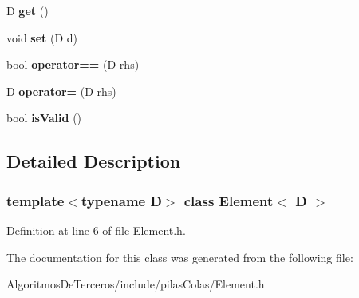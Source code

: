 \begin{DoxyCompactItemize}
D {\bfseries get} ()
\item 
\mbox{\label{class_element_a5327720f91a6006429b6b3a2eec46aaa}} 
void {\bfseries set} (D d)
\item 
\mbox{\label{class_element_a26ca0bf7130ed93df363576b9666ceeb}} 
bool {\bfseries operator==} (D rhs)
\item 
\mbox{\label{class_element_a18998203e5826498188b22b859927839}} 
D {\bfseries operator=} (D rhs)
\item 
\mbox{\label{class_element_a6f2ef9738bbc11107dc0e40366197189}} 
bool {\bfseries is\+Valid} ()
\end{DoxyCompactItemize}


\subsection{Detailed Description}
\subsubsection*{template$<$typename D$>$\newline
class Element$<$ D $>$}



Definition at line 6 of file Element.\+h.



The documentation for this class was generated from the following file\+:\begin{DoxyCompactItemize}
\item 
Algoritmos\+De\+Terceros/include/pilas\+Colas/Element.\+h\end{DoxyCompactItemize}
